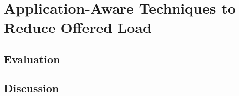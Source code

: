 \chapter{Application-Aware Techniques to Reduce Offered Load}
\label{chapter: load}





\section{Evaluation}
\section{Discussion}

% 
% 